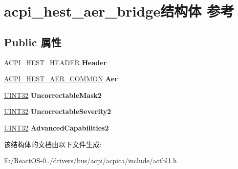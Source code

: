 \hypertarget{structacpi__hest__aer__bridge}{}\section{acpi\+\_\+hest\+\_\+aer\+\_\+bridge结构体 参考}
\label{structacpi__hest__aer__bridge}
\subsection*{Public 属性}
\begin{DoxyCompactItemize}
\item 
\mbox{\label{structacpi__hest__aer__bridge_aa983f63b877801d4f345f89758d315a2}} 
\hyperlink{structacpi__hest__header}{A\+C\+P\+I\+\_\+\+H\+E\+S\+T\+\_\+\+H\+E\+A\+D\+ER} {\bfseries Header}
\item 
\mbox{\label{structacpi__hest__aer__bridge_a115a6dd0a8fa38b95758fcc65aa5d860}} 
\hyperlink{structacpi__hest__aer__common}{A\+C\+P\+I\+\_\+\+H\+E\+S\+T\+\_\+\+A\+E\+R\+\_\+\+C\+O\+M\+M\+ON} {\bfseries Aer}
\item 
\mbox{\label{structacpi__hest__aer__bridge_afc68e614a150b3b02df2e88fdac524f1}} 
\hyperlink{_processor_bind_8h_ae1e6edbbc26d6fbc71a90190d0266018}{U\+I\+N\+T32} {\bfseries Uncorrectable\+Mask2}
\item 
\mbox{\label{structacpi__hest__aer__bridge_a11738540f65ca9de311387d00188d638}} 
\hyperlink{_processor_bind_8h_ae1e6edbbc26d6fbc71a90190d0266018}{U\+I\+N\+T32} {\bfseries Uncorrectable\+Severity2}
\item 
\mbox{\label{structacpi__hest__aer__bridge_a776b0c70128cc52afc7c65dafe12c44f}} 
\hyperlink{_processor_bind_8h_ae1e6edbbc26d6fbc71a90190d0266018}{U\+I\+N\+T32} {\bfseries Advanced\+Capabilities2}
\end{DoxyCompactItemize}


该结构体的文档由以下文件生成\+:\begin{DoxyCompactItemize}
\item 
E\+:/\+React\+O\+S-\/0../drivers/bus/acpi/acpica/include/actbl1.\+h\end{DoxyCompactItemize}
